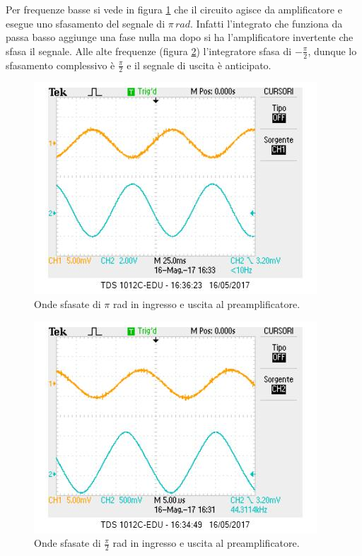 \documentclass[10pt,a4paper]{article}
\begin{document}
Per frequenze basse si vede in figura \ref{integratoreBasso} che il circuito agisce da amplificatore e esegue uno sfasamento del segnale di $\pi \, rad$. Infatti l'integrato che funziona da passa basso aggiunge una fase nulla ma dopo si ha  l'amplificatore invertente che sfasa il segnale. Alle alte frequenze (figura \ref{integratoreAlto}) l'integratore sfasa di $-\frac{\pi}{2}$, dunque lo sfasamento complessivo è $\frac{\pi}{2}$ e il segnale di uscita è anticipato.

\begin{figure}[!htb]
\centering
\includegraphics[scale=1.0]{integratoreBassaFrequenza.jpg}
\caption{Onde sfasate di $\pi$ rad in ingresso e uscita al preamplificatore.\label{integratoreBasso}}
\end{figure}

\begin{figure}[!htb]
\centering
\includegraphics[scale=1.0]{integratoreAltaFreq.jpg}
\caption{Onde sfasate di $\frac{\pi}{2}$ rad in ingresso e uscita al preamplificatore.\label{integratoreAlto}}
\end{figure}
\end{document}
